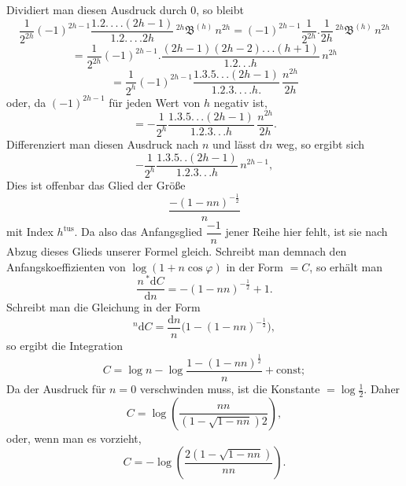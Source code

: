 \par\noindent{}%
Dividiert man diesen Ausdruck durch $0$, so bleibt
\[
\frac{1}{2^{2h}}(-1)^{2h-1}\frac{1.2.\,.\,.\,.(2h-1)}{1.2.\,.\,.\,. 2h}\,{}^{2h}\mathfrak{B}^{(h)}\,n^{2h} = (-1)^{2h-1}\frac{1}{2^{2h}} . \frac{1}{2h}\,{}^{2h}\mathfrak{B}^{(h)}\,n^{2h}
\]
\[
= \frac{1}{2^{2h}}(-1)^{2h-1} . \frac{(2h-1)(2h-2).\,.\,.(h+1)}{1.2.\,.\,. h}\,n^{2h}
\]
\[
= \frac{1}{2^{h}}(-1)^{2h-1}\frac{1.3.5.\,.\,.(2h-1)}{1.2.3.\,.\,.\,. h.}\,\frac{n^{2h}}{2h}
\]
oder, da $(-1)^{2h-1}$ für jeden Wert von $h$ negativ ist,
\[
= -\frac{1}{2^{h}}\frac{1.3.5.\,.\,.(2h-1)}{1.2.3.\,.\,. h}\,\frac{n^{2h}}{2h}.
\]
Differenziert man diesen Ausdruck nach $n$ und lässt $\mathrm{d}n$ weg, so ergibt sich
\[
-\frac{1}{2^{h}}\frac{1.3.5.\,.(2h-1)}{1.2.3.\,.\,. h}\,n^{2h-1},
\]
Dies ist offenbar das Glied der Größe
\[
\frac{-(1-nn)^{-\frac{1}{2}}}{n}
\]
mit Index $h^{\mathrm{tus}}$. Da also das Anfangsglied
$\dfrac{-1}{n}$ jener Reihe hier fehlt, ist sie nach Abzug dieses Glieds unserer Formel gleich. Schreibt man demnach den
Anfangskoeffizienten von $\log(1+n\cos\varphi)$ in der Form $=C$, so erhält man
\[
\frac{n\,{}^{*}\!\mathrm{d}C}{\mathrm{d}n} = -(1-nn)^{-\frac{1}{2}}+1.
\]
Schreibt man die Gleichung in der Form
\[
{}^{n}\mathrm{d}C = \frac{\mathrm{d}n}{n}\bigl(1-(1-nn)^{-\frac{1}{2}}\bigr),
\]
so ergibt die Integration
\[
C = \log n - \log\frac{1-(1-nn)^{\frac{1}{2}}}{n} + \mathrm{const};
\]
Da der Ausdruck für $n=0$ verschwinden muss, ist die Konstante $=\log\tfrac{1}{2}$. Daher
\[
C = \log\left(\frac{nn}{(1-\sqrt{1-nn})2}\right),
\]
oder, wenn man es vorzieht,
\[
C = -\log\left(\frac{2(1-\sqrt{1-nn})}{nn}\right).
\]

